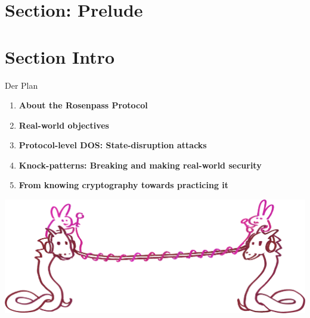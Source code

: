 \section{Section: Prelude}

\section{Section Intro}

\begin{frame}[c]{Der Plan}
  \centering
  \small

  \begin{enumerate}
    \item \textbf{About the Rosenpass Protocol}
    \item \textbf{Real-world objectives}
    \item \textbf{Protocol-level DOS: State-disruption attacks}
    \item \textbf{Knock-patterns: Breaking and making real-world security}
    \item \textbf{From knowing cryptography towards practicing it}
  \end{enumerate}

  \includegraphics[height=.4\textheight]{graphics/wireguard-and-rp-bunny-rose.png}
\end{frame}

